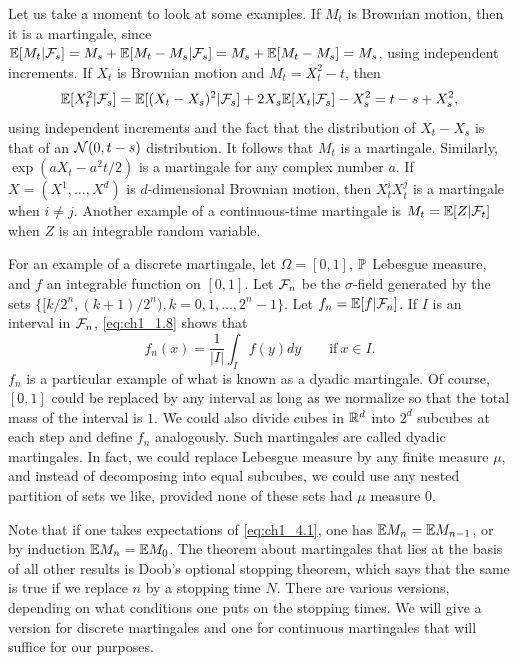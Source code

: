 Let us take a moment to look at some examples. If $M_t$ is Brownian motion, then it is a martingale, since $\E[M_t\mid\FC_s] = M_s + \E[M_t - M_s\mid\FC_s] = M_s + \E[M_t - M_s] = M_s$, using independent increments. If $X_t$ is Brownian motion and $M_t = X_t^2 - t$, then
\[
    \E[X_t^2\mid\FC_s] = \E[(X_t - X_s)^2\mid\FC_s] + 2X_s\E[X_t\mid\FC_s] - X_s^2 = t-s + X_s^2,
\]
using independent increments and the fact that the distribution of $X_t - X_s$ is that of an $\NC(0,t-s)$ distribution. It follows that $M_t$ is a martingale. Similarly, $\exp(aX_t - a^2t/2)$ is a martingale for any complex number $a$. If $X = (X^1,\ldots,X^d)$ is $d$-dimensional Brownian motion, then $X_t^iX_t^j$ is a martingale when $i \neq j$. Another example of a continuous-time martingale is $M_t = \E[Z\mid\FC_t]$ when $Z$ is an integrable random variable.

For an example of a discrete martingale, let $\Omega = [0,1]$, $\P$ Lebesgue measure, and $f$ an integrable function on $[0,1]$. Let $\FC_n$ be the $\sigma$-field generated by the sets $\{[k/2^n,(k+1)/2^n),k = 0,1,\ldots,2^n - 1\}$. Let $f_n = \E[f\mid\FC_n]$. If $I$ is an interval in $\FC_n$, \eqref{eq:ch1_1.8} shows that
\begin{equation}\label{eq:ch1_4.2}
    f_n(x) = \frac{1}{|I|}\int_I f(y)dy \qquad \text{if}~x \in I.
\end{equation}
$f_n$ is a particular example of what is known as a dyadic martingale. Of course, $[0,1]$ could be replaced by any interval as long as we normalize so that the total mass of the interval is $1$. We could also divide cubes in $\R^d$ into $2^d$ subcubes at each step and define $f_n$ analogously. Such martingales are called dyadic martingales. In fact, we could replace Lebesgue measure by any finite measure $\mu$, and instead of decomposing into equal subcubes, we could use any nested partition of sets we like, provided none of these sets had $\mu$ measure $0$.


Note that if one takes expectations of \eqref{eq:ch1_4.1}, one has $\E M_n = \E M_{n-1}$, or by induction $\E M_n = \E M_0$. The theorem about martingales that lies at the basis of all other results is Doob's optional stopping theorem, which says that the same is true if we replace $n$ by a stopping time $N$. There are various versions, depending on what conditions one puts on the stopping times. We will give a version for discrete martingales and one for continuous martingales that will suffice for our purposes.

